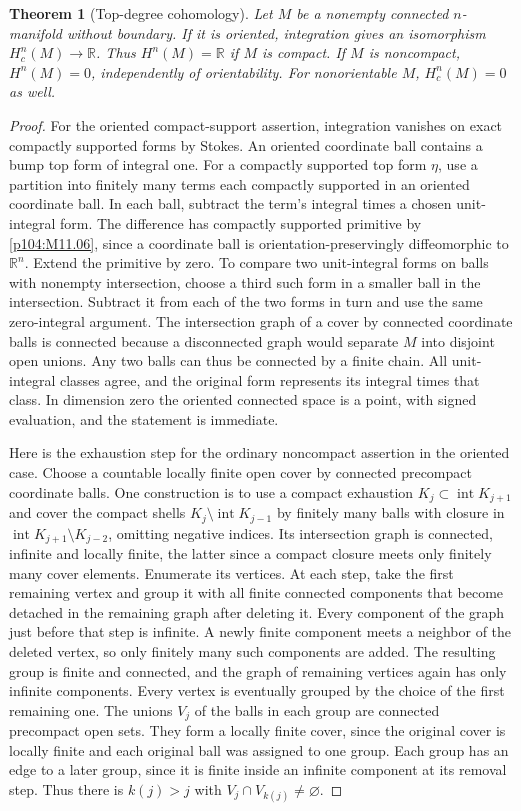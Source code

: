 \documentclass[11pt,oneside,openany]{book}
\newtheorem{theorem}{Theorem}[chapter]
\theoremstyle{definition}
\theoremstyle{remark}
\newcommand{\R}{\mathbb R}
\begin{document}
\begin{theorem}[Top-degree cohomology]
\label{p104:M11.07}
Let \(M\) be a nonempty connected \(n\)-manifold without boundary.
If it is oriented, integration gives an isomorphism
\(H_c^n(M)\to\R\). Thus \(H^n(M)=\R\) if \(M\) is compact.
If \(M\) is noncompact, \(H^n(M)=0\), independently of
orientability. For nonorientable \(M\), \(H_c^n(M)=0\) as well.
\end{theorem}
\begin{proof}
For the oriented compact-support assertion, integration vanishes
on exact compactly supported forms by Stokes. An oriented coordinate
ball contains a bump top form of integral one. For a compactly
supported top form \(\eta\), use a partition into finitely many
terms each compactly supported in an oriented coordinate ball.
In each ball, subtract the term's integral times a chosen
unit-integral form. The difference has compactly supported
primitive by \cref{p104:M11.06}, since a coordinate ball is
orientation-preservingly diffeomorphic to \(\R^n\). Extend the
primitive by zero. To compare two unit-integral forms on balls
with nonempty intersection, choose a third such form in a
smaller ball in the intersection. Subtract it from each of the
two forms in turn and use the same zero-integral argument.
The intersection graph of a cover by connected coordinate
balls is connected because a disconnected graph would
separate \(M\) into disjoint open unions. Any two balls
can thus be connected by a finite chain. All unit-integral
classes agree, and the original form represents its integral
times that class. In dimension zero the oriented connected
space is a point, with signed evaluation, and the statement
is immediate.

Here is the exhaustion step for the ordinary noncompact
assertion in the oriented case. Choose a countable locally
finite open cover by connected precompact coordinate balls.
One construction is to use a compact exhaustion
\(K_j\subset\operatorname{int}K_{j+1}\) and cover the compact
shells \(K_j\setminus\operatorname{int}K_{j-1}\) by finitely
many balls with closure in
\(\operatorname{int}K_{j+1}\setminus K_{j-2}\), omitting
negative indices. Its intersection graph is connected,
infinite and locally finite, the latter since a compact
closure meets only finitely many cover elements. Enumerate
its vertices. At each step, take the first remaining vertex
and group it with all finite connected components that become
detached in the remaining graph after deleting it. Every
component of the graph just before that step is infinite.
A newly finite component meets a neighbor of the deleted
vertex, so only finitely many such components are added.
The resulting group is finite and connected, and the graph
of remaining vertices again has only infinite components.
Every vertex is eventually grouped by the choice of the
first remaining one. The unions \(V_j\) of the balls in each
group are connected precompact open sets. They form a locally
finite cover, since the original cover is locally finite
and each original ball was assigned to one group. Each group
has an edge to a later group, since it is finite inside an
infinite component at its removal step. Thus there is
\(k(j)>j\) with \(V_j\cap V_{k(j)}\neq\varnothing\).


\end{proof}
\end{document}
